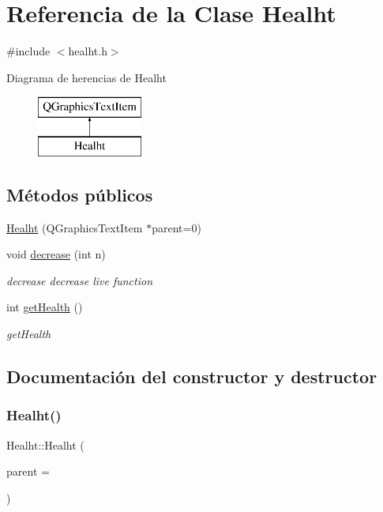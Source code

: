 \hypertarget{class_healht}{}\section{Referencia de la Clase Healht}
\label{class_healht}


{\ttfamily \#include $<$healht.\+h$>$}

Diagrama de herencias de Healht\begin{figure}[H]
\begin{center}
\leavevmode
\includegraphics[height=2.000000cm]{class_healht}
\end{center}
\end{figure}
\subsection*{Métodos públicos}
\begin{DoxyCompactItemize}
\item 
\hyperlink{class_healht_ae2cc49ac8d1332e5fc9923839c9f2f5a}{Healht} (Q\+Graphics\+Text\+Item $\ast$parent=0)
\item 
void \hyperlink{class_healht_a287604024264761de0026122d76f5b9d}{decrease} (int n)
\begin{DoxyCompactList}\small\item\em decrease decrease live function \end{DoxyCompactList}\item 
int \hyperlink{class_healht_a7ee67dc2c89fb370bc827cfedc8ae150}{get\+Health} ()
\begin{DoxyCompactList}\small\item\em get\+Health \end{DoxyCompactList}\end{DoxyCompactItemize}


\subsection{Documentación del constructor y destructor}
\hypertarget{class_healht_ae2cc49ac8d1332e5fc9923839c9f2f5a}{}\label{class_healht_ae2cc49ac8d1332e5fc9923839c9f2f5a} 
\subsubsection{\texorpdfstring{Healht()}{Healht()}}
{\footnotesize\ttfamily Healht\+::\+Healht (\begin{DoxyParamCaption}\item[{Q\+Graphics\+Text\+Item $\ast$}]{parent = {} }\end{DoxyParamCaption})}



